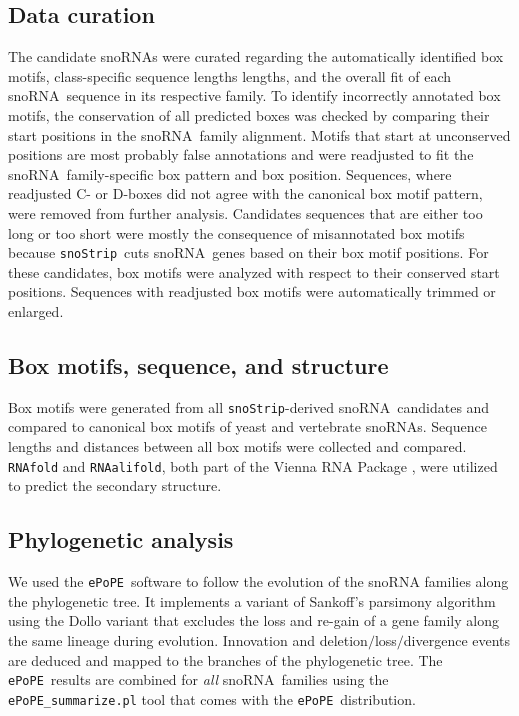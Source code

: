 \documentclass[preprint,3p,times]{elsarticle}
\newcommand{\sno}{snoRNA}
\newcommand{\snostrip}{\texttt{snoStrip}}
\newcommand{\epope}{\texttt{ePoPE}}
\begin{document}
\subsection{Data curation}

The candidate snoRNAs were curated regarding
the automatically identified box motifs, class-specific sequence
lengths lengths, and the overall fit of each \sno\ sequence in its
respective family. To identify incorrectly annotated box motifs, the
conservation of all predicted boxes was checked by comparing their
start positions in the \sno\ family alignment. Motifs that start
at unconserved positions are most probably false annotations and were
readjusted to fit the \sno\ family-specific box pattern and box
position.  Sequences, where readjusted C- or D-boxes did not agree
with the canonical box motif pattern, were removed from further
analysis.  Candidates sequences that are either too long or too short
were mostly the consequence of misannotated box motifs because
\snostrip\ cuts \sno\ genes based on their box motif positions. For
these candidates, box motifs were analyzed with respect to their
conserved start positions.  Sequences with readjusted
box motifs were automatically trimmed or enlarged.

\subsection{Box motifs, sequence, and structure}

Box motifs were generated from all \snostrip-derived \sno\ candidates
and compared to canonical box motifs of yeast and vertebrate snoRNAs.
Sequence lengths and distances between all box motifs were collected
and compared. \texttt{RNAfold} and \texttt{RNAalifold}, both part of
the Vienna RNA Package \cite{Hofacker:1994}, were utilized to predict
the secondary structure.

\subsection{Phylogenetic analysis}

We used the \epope\ software \cite{Hertel:2015} to follow the
evolution of the snoRNA families along the phylogenetic tree. It
implements a variant of Sankoff's parsimony algorithm using the Dollo
variant that excludes the loss and re-gain of a gene family along the
same lineage during evolution.  Innovation and
deletion$/$loss$/$divergence events are deduced and mapped to the
branches of the phylogenetic tree.  The \epope\ results are combined
for \emph{all} \sno\ families using the \texttt{ePoPE\_summarize.pl}
tool that comes with the \epope\ distribution.
\end{document}
